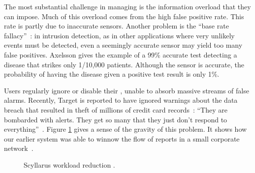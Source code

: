 The most substantial challenge in managing \idses is the information overload
that they can impose.
Much of this overload comes from the high false positive rate.  This rate is
partly due to
inaccurate sensors.
Another problem is the ``base rate fallacy''~\cite{Axelsson:1999:BFI:319709.319710}:
in intrusion detection, as in
other applications where very unlikely events must be detected, even a seemingly
accurate sensor may yield too many false positives.  Axelsson gives the example
of a 99\% accurate test detecting a disease that strikes only 1/10,000
patients.  
Although the sensor is accurate, 
the probability of having the disease given a positive test result is
only 1\%.

Users regularly ignore or disable their {\idses}, unable to absorb
massive streams of false alarms.
Recently, Target is reported to have ignored warnings about the
data breach that resulted in theft of millions of credit
card records~\cite{TargetIgnoredIDS}:
``They are bombarded with alerts. They get so many that they just don't respond
to everything''~\cite{finkle14:_target}.
Figure
\ref{fig:workloadReduction} gives a sense of the gravity of this
problem. It shows how our earlier system was able to winnow
the 
flow of reports in a small corporate network~.
\begin{figure}[t]
  \centering
  \caption{Scyllarus workload reduction%
.}
  \label{fig:workloadReduction}
\end{figure}



